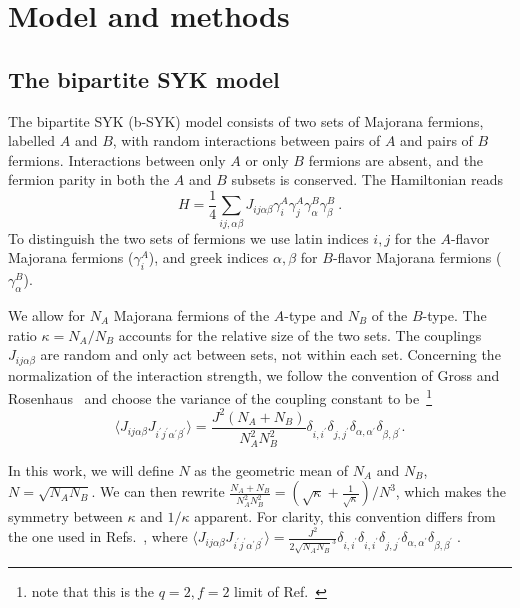 \section{Model and methods}\label{sec_model}

\subsection{The bipartite SYK model}

The bipartite SYK (b-SYK) model consists of two sets of Majorana fermions, labelled $A$ and $B$,
with random interactions between pairs of $A$ and pairs of $B$ fermions.
Interactions between only $A$ or only $B$ fermions are absent,
and the fermion parity in both the $A$ and $B$ subsets is conserved.
The Hamiltonian reads
%
\begin{equation}
	H = \frac{1}{4}\sum_{ij,\alpha\beta}J_{ij\alpha\beta}\gamma^A_i\gamma^A_j \gamma^B_\alpha \gamma^B_\beta~.
\end{equation}
%
To distinguish the two sets of fermions we use latin indices $i,j$ for the $A$-flavor Majorana fermions ($\gamma_i^A$),
and greek indices $\alpha,\beta$ for $B$-flavor Majorana fermions ($\gamma_\alpha^B$).

We allow for $N_A$ Majorana fermions of the $A$-type and $N_B$ of the $B$-type.
The ratio $\kappa=N_A/N_B$ accounts for the relative size of the two sets.
The couplings $J_{ij\alpha\beta}$ are random and only act between sets, not within each set.
Concerning the normalization of the interaction strength, we follow the convention of Gross and Rosenhaus~\cite{gross_generalization_2017} and choose the variance of the coupling constant to be~\footnote {note that this is the $q=2, f=2$ limit of Ref.~\cite{gross_generalization_2017}}
%
\[
\langle J_{ij\alpha\beta} J_{i^{\prime}j^{\prime}\alpha^{\prime}\beta^{\prime}}\rangle=
\frac{J^2(N_A+N_B)}{N_A^2N_B^2}\delta_{i,i^{\prime}}\delta_{j,j^{\prime}}\delta_{\alpha,\alpha^{\prime}}\delta_{\beta,\beta^{\prime}}.
\] 

In this work, we will define $N$ as the geometric mean of $N_A$ and $N_B$, $N=\sqrt{N_{A}N_{B}}$.
We can then rewrite $\frac{N_A+N_B}{N_A^2N_B^2}=(\sqrt{\kappa} + \frac{1}{\sqrt{\kappa}})/N^3$,
which makes the symmetry between $\kappa$ and $1/\kappa$ apparent.
For clarity, this convention differs from the one used in Refs.~\cite{Fremling_2022,fremling_bipartite_2021}, where 
%
$
\langle J_{ij\alpha\beta} J_{i^{\prime}j^{\prime}\alpha^{\prime}\beta^{\prime}}\rangle=
\frac{J^2}{2\sqrt{N_A N_B}^3}\delta_{i,i^{\prime}}\delta_{i,i^{\prime}}\delta_{j,j^{\prime}}\delta_{\alpha,\alpha^{\prime}}\delta_{\beta,\beta^{\prime}}\;.$



